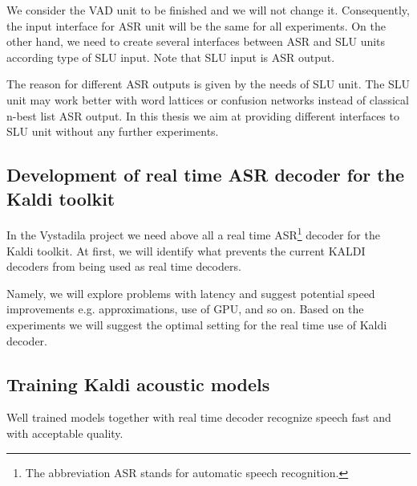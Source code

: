 We consider the VAD unit to be finished and we will not change it. Consequently, the input interface for ASR unit will be the same for all experiments. On the other hand, we need to create several interfaces between ASR and SLU units according type of SLU input. Note that SLU input is ASR output. 

The reason for different ASR outputs is given by the needs of SLU unit. The SLU unit may work better with word lattices or confusion networks instead of classical n-best list ASR output. In this thesis we aim at providing different interfaces to SLU unit without any further experiments.




\subsection{Development of real time ASR decoder for the Kaldi toolkit}
\label{sub:kaldi_rt_decoder}
In the Vystadila project we need above all a real time ASR\footnote{The abbreviation ASR stands for automatic speech recognition.} decoder for the Kaldi toolkit. At first, we will identify what prevents the current KALDI decoders from being used as real time decoders. 

Namely, we will explore problems with latency and suggest potential speed improvements e.g. approximations, use of GPU, and so on. Based on the experiments we will suggest the optimal setting for the real time use of Kaldi decoder.


\subsection{Training Kaldi acoustic models} 
\label{sub:training_kaldi_acoustic_models}
Well trained models together with real time decoder recognize speech fast and with acceptable quality.

